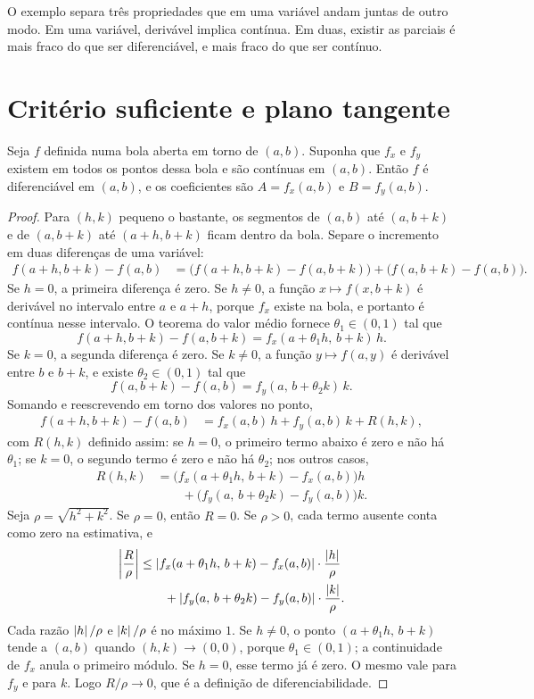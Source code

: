 \documentclass[11pt,a4paper]{article}
\begin{document}
O exemplo separa três propriedades que em uma variável andam juntas de outro modo. Em uma variável, derivável implica contínua. Em duas, existir as parciais é mais fraco do que ser diferenciável, e mais fraco do que ser contínuo.

\section{Critério suficiente e plano tangente}

\begin{teorema}
Seja $f$ definida numa bola aberta em torno de $(a,b)$. Suponha que $f_x$ e $f_y$ existem em todos os pontos dessa bola e são contínuas em $(a,b)$. Então $f$ é diferenciável em $(a,b)$, e os coeficientes são $A=f_x(a,b)$ e $B=f_y(a,b)$.
\end{teorema}

\begin{proof}
Para $(h,k)$ pequeno o bastante, os segmentos de $(a,b)$ até $(a,b+k)$ e de $(a,b+k)$ até $(a+h,b+k)$ ficam dentro da bola. Separe o incremento em duas diferenças de uma variável:
\begin{align*}
f(a+h,b+k)-f(a,b)
&=
\bigl(f(a+h,b+k)-f(a,b+k)\bigr)
+
\bigl(f(a,b+k)-f(a,b)\bigr).
\end{align*}
Se $h=0$, a primeira diferença é zero. Se $h\neq 0$, a função $x\mapsto f(x,b+k)$ é derivável no intervalo entre $a$ e $a+h$, porque $f_x$ existe na bola, e portanto é contínua nesse intervalo. O teorema do valor médio fornece $\theta_1\in(0,1)$ tal que
\[
f(a+h,b+k)-f(a,b+k)=f_x(a+\theta_1 h,\,b+k)\,h.
\]
Se $k=0$, a segunda diferença é zero. Se $k\neq 0$, a função $y\mapsto f(a,y)$ é derivável entre $b$ e $b+k$, e existe $\theta_2\in(0,1)$ tal que
\[
f(a,b+k)-f(a,b)=f_y(a,\,b+\theta_2 k)\,k.
\]
Somando e reescrevendo em torno dos valores no ponto,
\begin{align*}
f(a+h,b+k)-f(a,b)
&=f_x(a,b)\,h+f_y(a,b)\,k+R(h,k),
\end{align*}
com $R(h,k)$ definido assim: se $h=0$, o primeiro termo abaixo é zero e não há $\theta_1$; se $k=0$, o segundo termo é zero e não há $\theta_2$; nos outros casos,
\begin{align*}
R(h,k)
&=\bigl(f_x(a+\theta_1 h,\,b+k)-f_x(a,b)\bigr)h\\
&\qquad+\bigl(f_y(a,\,b+\theta_2 k)-f_y(a,b)\bigr)k.
\end{align*}
Seja $\rho=\sqrt{h^2+k^2}$. Se $\rho=0$, então $R=0$. Se $\rho>0$, cada termo ausente conta como zero na estimativa, e
\begin{align*}
\left\lvert \frac{R}{\rho} \right\rvert
&\le\left\lvert f_x(a+\theta_1 h,\,b+k)-f_x(a,b) \right\rvert\cdot\frac{\left\lvert h \right\rvert}{\rho}\\
&\qquad+\left\lvert f_y(a,\,b+\theta_2 k)-f_y(a,b) \right\rvert\cdot\frac{\left\lvert k \right\rvert}{\rho}.
\end{align*}
Cada razão $\left\lvert h \right\rvert/\rho$ e $\left\lvert k \right\rvert/\rho$ é no máximo $1$. Se $h\neq 0$, o ponto $(a+\theta_1 h,\,b+k)$ tende a $(a,b)$ quando $(h,k)\to(0,0)$, porque $\theta_1\in(0,1)$; a continuidade de $f_x$ anula o primeiro módulo. Se $h=0$, esse termo já é zero. O mesmo vale para $f_y$ e para $k$. Logo $R/\rho\to 0$, que é a definição de diferenciabilidade.
\end{proof}
\end{document}
